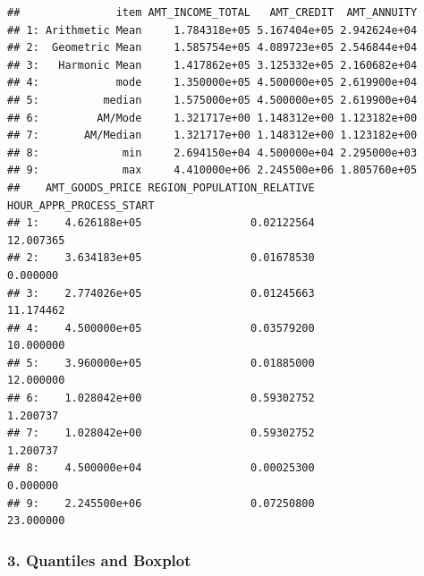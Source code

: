 \documentclass[]{article}
\begin{document}
\begin{verbatim}
##               item AMT_INCOME_TOTAL   AMT_CREDIT  AMT_ANNUITY
## 1: Arithmetic Mean     1.784318e+05 5.167404e+05 2.942624e+04
## 2:  Geometric Mean     1.585754e+05 4.089723e+05 2.546844e+04
## 3:   Harmonic Mean     1.417862e+05 3.125332e+05 2.160682e+04
## 4:            mode     1.350000e+05 4.500000e+05 2.619900e+04
## 5:          median     1.575000e+05 4.500000e+05 2.619900e+04
## 6:         AM/Mode     1.321717e+00 1.148312e+00 1.123182e+00
## 7:       AM/Median     1.321717e+00 1.148312e+00 1.123182e+00
## 8:             min     2.694150e+04 4.500000e+04 2.295000e+03
## 9:             max     4.410000e+06 2.245500e+06 1.805760e+05
##    AMT_GOODS_PRICE REGION_POPULATION_RELATIVE HOUR_APPR_PROCESS_START
## 1:    4.626188e+05                 0.02122564               12.007365
## 2:    3.634183e+05                 0.01678530                0.000000
## 3:    2.774026e+05                 0.01245663               11.174462
## 4:    4.500000e+05                 0.03579200               10.000000
## 5:    3.960000e+05                 0.01885000               12.000000
## 6:    1.028042e+00                 0.59302752                1.200737
## 7:    1.028042e+00                 0.59302752                1.200737
## 8:    4.500000e+04                 0.00025300                0.000000
## 9:    2.245500e+06                 0.07250800               23.000000
\end{verbatim}

\subsubsection{3. Quantiles and Boxplot}\label{quantiles-and-boxplot}
\end{document}
